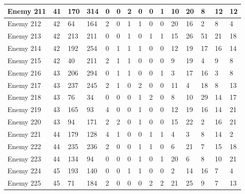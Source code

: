 \begin{sidewaystable}[!h]
{\begin{tabular}{|l|l|l|l|l|l|l|l|l|l|l|l|l|l|l|}
			Enemy 211 & 41 & 170 & 314 & 0 & 0 & 2 & 0 & 0 & 1 & 10 & 20 & 8 & 12 & 12 \\ \hline
			Enemy 212 & 42 & 64 & 164 & 2 & 0 & 1 & 1 & 0 & 0 & 20 & 16 & 2 & 8 & 4 \\ \hline
			Enemy 213 & 42 & 213 & 211 & 0 & 0 & 1 & 0 & 1 & 1 & 15 & 26 & 51 & 21 & 18 \\ \hline
			Enemy 214 & 42 & 192 & 254 & 0 & 1 & 1 & 1 & 0 & 0 & 12 & 19 & 17 & 16 & 14 \\ \hline
			Enemy 215 & 42 & 40 & 211 & 2 & 1 & 1 & 0 & 0 & 0 & 9 & 19 & 4 & 9 & 8 \\ \hline
			Enemy 216 & 43 & 206 & 294 & 0 & 1 & 1 & 0 & 0 & 1 & 3 & 17 & 16 & 3 & 8 \\ \hline
			Enemy 217 & 43 & 237 & 245 & 2 & 1 & 0 & 2 & 0 & 0 & 11 & 4 & 18 & 8 & 13 \\ \hline
			Enemy 218 & 43 & 76 & 34 & 0 & 0 & 0 & 1 & 2 & 0 & 8 & 10 & 29 & 14 & 17 \\ \hline
			Enemy 219 & 43 & 165 & 93 & 4 & 0 & 0 & 1 & 0 & 0 & 12 & 19 & 16 & 14 & 21 \\ \hline
			Enemy 220 & 43 & 94 & 171 & 2 & 2 & 0 & 1 & 0 & 0 & 15 & 22 & 2 & 16 & 21 \\ \hline
			Enemy 221 & 44 & 179 & 128 & 4 & 1 & 0 & 0 & 1 & 1 & 4 & 3 & 8 & 14 & 2 \\ \hline
			Enemy 222 & 44 & 235 & 236 & 2 & 0 & 0 & 1 & 1 & 0 & 6 & 21 & 7 & 15 & 18 \\ \hline
			Enemy 223 & 44 & 134 & 94 & 0 & 0 & 0 & 1 & 0 & 1 & 20 & 6 & 8 & 10 & 21 \\ \hline
			Enemy 224 & 45 & 193 & 140 & 0 & 0 & 1 & 1 & 0 & 0 & 2 & 14 & 16 & 7 & 4 \\ \hline
			Enemy 225 & 45 & 71 & 184 & 2 & 0 & 0 & 0 & 2 & 2 & 21 & 25 & 9 & 7 & 13 \\ \hline
		\end{tabular}%
	}
\end{sidewaystable}
\clearpage


